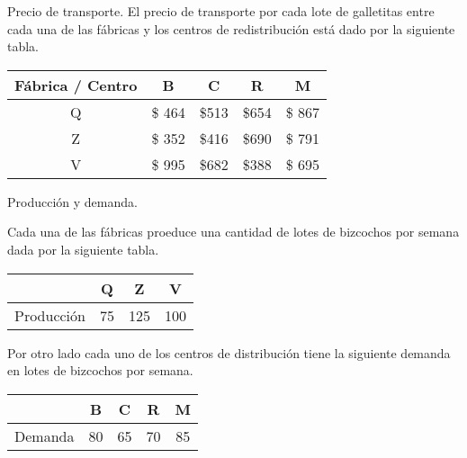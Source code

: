 \documentclass{beamer}
\begin{document}
\begin{frame}[fragile]{Precio de transporte.}
  El precio de transporte por cada lote de galletitas entre cada una de las fábricas y los centros de redistribución está dado por la siguiente tabla.

  
  \begin{center}
    \begin{tabular}{|c | c | 
      c| c| c|}
      \hline
      Fábrica / Centro & B & C & R & M\\
      \hline
      Q   & \$ 464 & \$513 &  \$654 & \$ 867 \\
      Z   & \$ 352 & \$416 &  \$690 & \$ 791 \\
      V   & \$ 995 & \$682 &  \$388 & \$ 695 \\
      \hline
    \end{tabular}
  \end{center}
\end{frame}

\begin{frame}[fragile]{Producción y demanda.}
  
  Cada una de las fábricas proeduce una cantidad de lotes de bizcochos por semana dada por la siguiente tabla.

  \begin{center}
    \begin{tabular}{|c|c|c|c|}
      \hline
       & Q & Z & V \\
      \hline
      Producción & 75 & 125 & 100 \\
      \hline
    \end{tabular}
  \end{center}

  \pause 
  \bigskip 
  Por otro lado cada uno de los centros de distribución tiene la siguiente demanda en lotes de bizcochos por semana.
  
  \begin{center}
    \begin{tabular}{|c|c|c|c|c|}
      \hline
       & B & C & R & M \\
      \hline
      Demanda & 80 & 65 & 70 & 85 \\
      \hline
    \end{tabular}
  \end{center}

  \pause
\end{frame}
\end{document}
